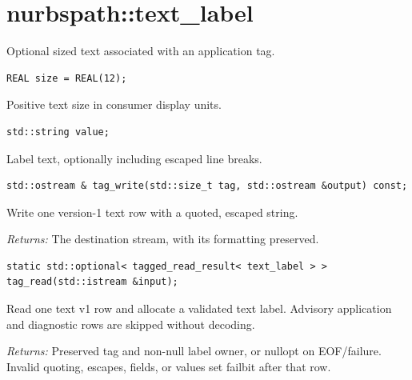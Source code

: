 \section{nurbspath::text\_label}
Optional sized text associated with an application tag.
\par\noindent\begin{minipage}{\linewidth}
\begin{lstlisting}[style=apireference]
REAL size = REAL(12);
\end{lstlisting}
{\footnotesize Positive text size in consumer display units.\par}
\end{minipage}\par\vspace{1pt}
\par\noindent\begin{minipage}{\linewidth}
\begin{lstlisting}[style=apireference]
std::string value;
\end{lstlisting}
{\footnotesize Label text, optionally including escaped line breaks.\par}
\end{minipage}\par\vspace{1pt}
\par\noindent\begin{minipage}{\linewidth}
\begin{lstlisting}[style=apireference]
std::ostream & tag_write(std::size_t tag, std::ostream &output) const;
\end{lstlisting}
{\footnotesize Write one version-1 text row with a quoted, escaped string.\par}
{\footnotesize\textit{Returns:} The destination stream, with its formatting preserved.\par}
\end{minipage}\par\vspace{1pt}
\par\noindent\begin{minipage}{\linewidth}
\begin{lstlisting}[style=apireference]
static std::optional< tagged_read_result< text_label > > tag_read(std::istream &input);
\end{lstlisting}
{\footnotesize Read one text v1 row and allocate a validated text label. Advisory application and diagnostic rows are skipped without decoding.\par}
{\footnotesize\textit{Returns:} Preserved tag and non-null label owner, or nullopt on EOF/failure. Invalid quoting, escapes, fields, or values set failbit after that row.\par}
\end{minipage}\par\vspace{1pt}
